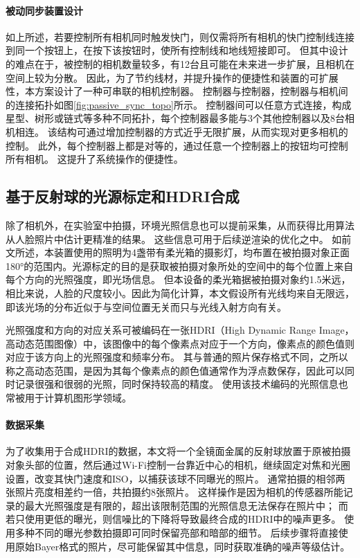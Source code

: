 \paragraph{被动同步装置设计}
如上所述，若要控制所有相机同时触发快门，则仅需将所有相机的快门控制线连接到同一个按钮上，在按下该按钮时，使所有控制线和地线短接即可。
但其中设计的难点在于，被控制的相机数量较多，有12台且可能在未来进一步扩展，且相机在空间上较为分散。
因此，为了节约线材，并提升操作的便捷性和装置的可扩展性，本方案设计了一种可串联的相机控制器。
控制器与控制器，控制器与相机间的连接拓扑如图\ref{fig:passive_sync_topo}所示。
控制器间可以任意方式连接，构成星型、树形或链式等多种不同拓扑，每个控制器最多能与3个其他控制器以及8台相机相连。
该结构可通过增加控制器的方式近乎无限扩展，从而实现对更多相机的控制。
此外，每个控制器上都是对等的，通过任意一个控制器上的按钮均可控制所有相机。
这提升了系统操作的便捷性。



\subsection{基于反射球的光源标定和HDRI合成}
\label{sec:light_calib}

除了相机外，在实验室中拍摄，环境光照信息也可以提前采集，从而获得比用算法从人脸照片中估计更精准的结果。
这些信息可用于后续逆渲染的优化之中。
如前文所述，本装置使用的照明为4盏带有柔光箱的摄影灯，均布置在被拍摄对象正面180°的范围内。光源标定的目的是获取被拍摄对象所处的空间中的每个位置上来自每个方向的光照强度，即光场信息。
但本设备的柔光箱据被拍摄对象约1.5米远，相比来说，人脸的尺度较小。因此为简化计算，本文假设所有光线均来自无限远，即该光场的分布近似于与空间位置无关而只与光线入射方向有关。

光照强度和方向的对应关系可被编码在一张HDRI（High Dynamic Range Image，高动态范围图像）中，该图像中的每个像素点对应于一个方向，像素点的颜色值则对应于该方向上的光照强度和频率分布。
其与普通的照片保存格式不同，之所以称之高动态范围，是因为其每个像素点的颜色值通常作为浮点数保存，因此可以同时记录很强和很弱的光照，同时保持较高的精度。
使用该技术编码的光照信息也常被用于计算机图形学领域。

\paragraph{数据采集}
为了收集用于合成HDRI的数据，本文将一个全镜面金属的反射球放置于原被拍摄对象头部的位置，然后通过Wi-Fi控制一台靠近中心的相机，继续固定对焦和光圈设置，改变其快门速度和ISO，以捕获该球不同曝光的照片。
通常拍摄的相邻两张照片亮度相差约一倍，共拍摄约8张照片。
这样操作是因为相机的传感器所能记录的最大光照强度是有限的，超出该限制范围的光照信息无法保存在照片中；
而若只使用更低的曝光，则信噪比的下降将导致最终合成的HDRI中的噪声更多。
使用多种不同的曝光参数拍摄即可同时保留亮部和暗部的细节。
后续步骤将直接使用原始Bayer格式的照片，尽可能保留其中信息，同时获取准确的噪声等级估计。

